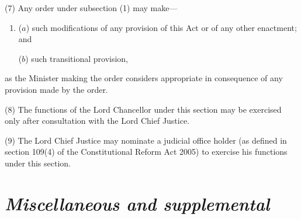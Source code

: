\documentclass[12pt,a4paper]{article}
\begin{document}

(7) Any order under subsection (1)  
may make—
\begin{enumerate}\item[]
($a$) such modifications of any provision of this Act or of any other enactment; and

($b$) such transitional provision,
\end{enumerate}
as the Minister making the order considers appropriate in consequence of any provision made by the order.

(8) The functions of the Lord Chancellor under this section may be exercised only after consultation with the Lord Chief Justice.

(9) The Lord Chief Justice may nominate a judicial office holder (as defined in section 109(4) of the Constitutional Reform Act 2005) to exercise his functions under this section.


\section{\itshape Miscellaneous and supplemental}
\end{document}
